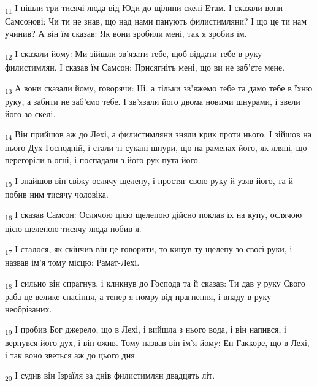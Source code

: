 \begin{tcolorbox}
\textsubscript{11} І пішли три тисячі люда від Юди до щілини скелі Етам. І сказали вони Самсонові: Чи ти не знав, що над нами панують филистимляни? І що це ти нам учинив? А він їм сказав: Як вони зробили мені, так я зробив їм.
\end{tcolorbox}
\begin{tcolorbox}
\textsubscript{12} І сказали йому: Ми зійшли зв'язати тебе, щоб віддати тебе в руку филистимлян. І сказав їм Самсон: Присягніть мені, що ви не заб'єте мене.
\end{tcolorbox}
\begin{tcolorbox}
\textsubscript{13} А вони сказали йому, говорячи: Ні, а тільки зв'яжемо тебе та дамо тебе в їхню руку, а забити не заб'ємо тебе. І зв'язали його двома новими шнурами, і звели його зо скелі.
\end{tcolorbox}
\begin{tcolorbox}
\textsubscript{14} Він прийшов аж до Лехі, а филистимляни зняли крик проти нього. І зійшов на нього Дух Господній, і стали ті сукані шнури, що на раменах його, як лляні, що перегоріли в огні, і поспадали з його рук пута його.
\end{tcolorbox}
\begin{tcolorbox}
\textsubscript{15} І знайшов він свіжу ослячу щелепу, і простяг свою руку й узяв його, та й побив ним тисячу чоловіка.
\end{tcolorbox}
\begin{tcolorbox}
\textsubscript{16} І сказав Самсон: Ослячою цією щелепою дійсно поклав їх на купу, ослячою цією щелепою тисячу люда побив я.
\end{tcolorbox}
\begin{tcolorbox}
\textsubscript{17} І сталося, як скінчив він це говорити, то кинув ту щелепу зо своєї руки, і назвав ім'я тому місцю: Рамат-Лехі.
\end{tcolorbox}
\begin{tcolorbox}
\textsubscript{18} І сильно він спрагнув, і кликнув до Господа та й сказав: Ти дав у руку Свого раба це велике спасіння, а тепер я помру від прагнення, і впаду в руку необрізаних.
\end{tcolorbox}
\begin{tcolorbox}
\textsubscript{19} І пробив Бог джерело, що в Лехі, і вийшла з нього вода, і він напився, і вернувся його дух, і він ожив. Тому назвав він ім'я йому: Ен-Гаккоре, що в Лехі, і так воно зветься аж до цього дня.
\end{tcolorbox}
\begin{tcolorbox}
\textsubscript{20} І судив він Ізраїля за днів филистимлян двадцять літ.
\end{tcolorbox}
